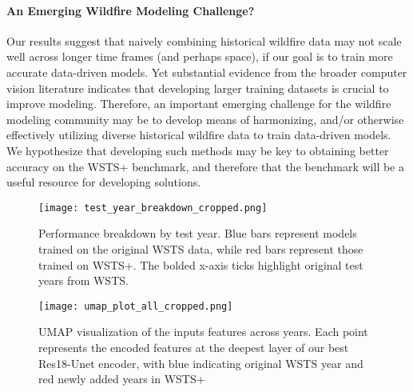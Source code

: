 \paragraph{An Emerging Wildfire Modeling Challenge?} Our results suggest that naively combining historical wildfire data may not scale well across longer time frames (and perhaps space), if our goal is to train more accurate data-driven models. Yet substantial evidence from the broader computer vision literature indicates that developing larger training datasets is crucial to improve modeling.  Therefore, an important emerging challenge for the wildfire modeling community may be to develop means of harmonizing, and/or otherwise effectively utilizing diverse historical wildfire data to train data-driven models.  We hypothesize that developing such methods may be key to obtaining better accuracy on the WSTS+ benchmark, and therefore that the benchmark will be a useful resource for developing solutions. 


\begin{figure}
    \centering
    \texttt{[image: test\_year\_breakdown\_cropped.png]}
    \caption{Performance breakdown by test year. Blue bars represent models trained on the original WSTS data, while red bars represent those trained on WSTS+. The bolded x-axis ticks highlight original test years from WSTS.}
    \label{fig:wsts-plot}
\end{figure}



\begin{figure}
    \centering
    \texttt{[image: umap\_plot\_all\_cropped.png]}
    \caption{UMAP visualization of the inputs features across years. Each point represents the encoded features at the deepest layer of our best Res18-Unet encoder, with blue indicating original WSTS year and red newly added years in WSTS+}
    \label{fig:umap}
\end{figure}
